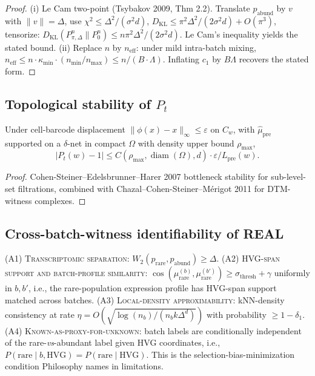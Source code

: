 \begin{proof}
(i) Le Cam two-point (Tsybakov 2009, Thm 2.2). Translate $p_{\text{abund}}$ by $v$ with $\|v\|=\Delta$, use $\chi^{2}\leq \Delta^{2}/(\sigma^{2}d)$, $D_{\mathrm{KL}}\leq \pi^{2}\Delta^{2}/(2\sigma^{2}d)+O(\pi^{3})$, tensorize: $D_{\mathrm{KL}}(P_{\pi,\Delta}^{n}\|P_{0}^{n})\leq n\pi^{2}\Delta^{2}/(2\sigma^{2}d)$. Le Cam's inequality yields the stated bound.
(ii) Replace $n$ by $n_{\mathrm{eff}}$: under mild intra-batch mixing, $n_{\mathrm{eff}}\leq n\cdot \kappa_{\min}\cdot (n_{\min}/n_{\max})\leq n/(B\cdot \Lambda)$. Inflating $c_{1}$ by $B\Lambda$ recovers the stated form.
\end{proof}

\subsection{Topological stability of $P_t$}
\label{sec:S1-pt-stability}

\begin{theorem}
\label{thm:S1-pt-stability}
Under cell-barcode displacement $\|\phi(x)-x\|_{\infty}\leq\varepsilon$ on $C_{w}$, with $\widehat{\mu}_{\mathrm{pre}}$ supported on a $\delta$-net in compact $\Omega$ with density upper bound $\rho_{\max}$,
\[
  |P_{t}(w)-1|\leq C(\rho_{\max},\operatorname{diam}(\Omega),d)\cdot \varepsilon/L_{\mathrm{pre}}(w).
\]
\end{theorem}

\begin{proof}
Cohen-Steiner--Edelsbrunner--Harer 2007 bottleneck stability for sub-level-set filtrations, combined with Chazal--Cohen-Steiner--M\'erigot 2011 for DTM-witness complexes.
\end{proof}

\subsection{Cross-batch-witness identifiability of REAL}
\label{sec:S1-identifiability}

\begin{assumption}[A1--A4]\label{ass:S1}
  (A1) \textsc{Transcriptomic separation}: $W_{2}(p_{\text{rare}},p_{\text{abund}})\geq\Delta$.
  (A2) \textsc{HVG-span support and batch-profile similarity}: $\cos(\mu_{\text{rare}}^{(b)},\mu_{\text{rare}}^{(b')})\geq \sigma_{\text{thresh}}+\gamma$ uniformly in $b,b'$, i.e., the rare-population expression profile has HVG-span support matched across batches.
  (A3) \textsc{Local-density approximability}: kNN-density consistency at rate $\eta=O(\sqrt{\log(n_{b})/(n_{b}k\Delta^{d})})$ with probability $\geq 1-\delta_{1}$.
  (A4) \textsc{Known-as-proxy-for-unknown}: batch labels are conditionally independent of the rare-\emph{vs}-abundant label given HVG coordinates, i.e., $P(\text{rare}\mid b,\text{HVG})=P(\text{rare}\mid \text{HVG})$. This is the selection-bias-minimization condition Philosophy names in limitations.
\end{assumption}

